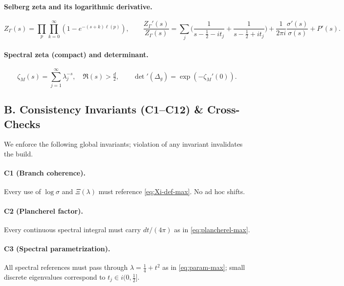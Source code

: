 \paragraph{Selberg zeta and its logarithmic derivative.}
\begin{equation}
  Z_\Gamma(s)=\prod_{p}\prod_{k=0}^\infty(1-e^{-(s+k)\ell(p)}),\qquad
  \frac{Z_\Gamma'(s)}{Z_\Gamma(s)}=\sum_j\Big(\frac{1}{s-\tfrac12-it_j}+\frac{1}{s-\tfrac12+it_j}\Big)+\frac{1}{2\pi i}\frac{\sigma'(s)}{\sigma(s)}+P'(s).
  \label{eq:Zprime-max}
\end{equation}

\paragraph{Spectral zeta (compact) and determinant.}
\begin{equation}
  \zeta_M(s)=\sum_{j=1}^{\infty}\lambda_j^{-s},\quad \Re(s)>\tfrac d2,\qquad
  \det{}'(\Delta_g)=\exp(-\zeta_M'(0)).
  \label{eq:zetadet-max}
\end{equation}


\subsection*{B. Consistency Invariants (C1–C12) \& Cross-Checks}
\label{subsec:invariants-max}

We enforce the following global invariants; violation of any invariant invalidates the build.

\paragraph{C1 (Branch coherence).}
Every use of $\log\sigma$ and $\Xi(\lambda)$ must reference \eqref{eq:Xi-def-max}. No ad hoc shifts.

\paragraph{C2 (Plancherel factor).}
Every continuous spectral integral must carry $dt/(4\pi)$ as in \eqref{eq:plancherel-max}.

\paragraph{C3 (Spectral parametrization).}
All spectral references must pass through $\lambda=\tfrac14+t^2$ as in \eqref{eq:param-max}; small discrete eigenvalues correspond to $t_j\in i(0,\tfrac12]$.

